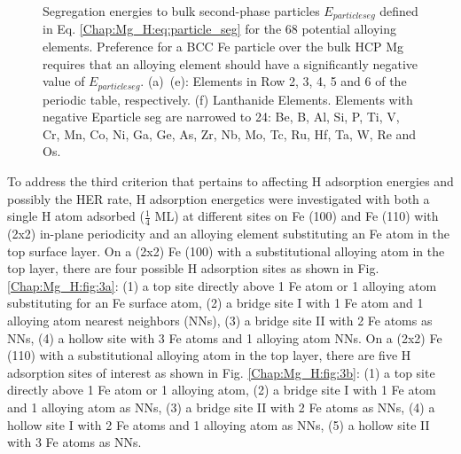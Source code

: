 \begin{figure}[!ht]
  \label{Chap:Mg_H:fig:5f}
\caption[Segregation energies to bulk second-phase particles]{Segregation energies to bulk second-phase particles $E_{particle seg}$ defined in Eq. \ref{Chap:Mg_H:eq:particle_seg} for the 68 potential alloying elements. Preference for a \ac{BCC} Fe particle over the bulk \ac{HCP} Mg requires that an alloying element should have a significantly negative value of $E_{particle seg}$. (a)~(e): Elements in Row 2, 3, 4, 5 and 6 of the periodic table, respectively. (f) Lanthanide Elements. Elements with negative Eparticle seg are narrowed to 24: Be, B, Al, Si, P, Ti, V, Cr, Mn, Co, Ni, Ga, Ge, As, Zr, Nb, Mo, Tc, Ru, Hf, Ta, W, Re and Os.}
  \label{Chap:Mg_H:fig5}
\end{figure}
\endgroup

To address the third criterion that pertains to affecting H adsorption energies and possibly the HER rate, H adsorption energetics were investigated with both a single H atom adsorbed ($\frac{1}{4}$ \ac{ML}) at different sites on Fe (100) and Fe (110) with (2x2) in-plane periodicity and an alloying element substituting an Fe atom in the top surface layer. On a (2x2) Fe (100) with a substitutional alloying atom in the top layer, there are four possible H adsorption sites as shown in Fig. \ref{Chap:Mg_H:fig:3a}: (1) a top site directly above 1 Fe atom or 1 alloying atom substituting for an Fe surface atom, (2) a bridge site I with 1 Fe atom and 1 alloying atom nearest neighbors (NNs), (3) a bridge site II with 2 Fe atoms as NNs, (4) a hollow site with 3 Fe atoms and 1 alloying atom NNs. On a (2x2) Fe (110) with a substitutional alloying atom in the top layer, there are five H adsorption sites of interest as shown in Fig. \ref{Chap:Mg_H:fig:3b}: (1) a top site directly above 1 Fe atom or 1 alloying atom, (2) a bridge site I with 1 Fe atom and 1 alloying atom as NNs, (3) a bridge site II with 2 Fe atoms as NNs, (4) a hollow site I with 2 Fe atoms and 1 alloying atom as NNs, (5) a hollow site II with 3 Fe atoms as NNs.

